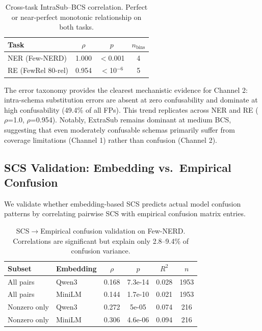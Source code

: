 \documentclass[11pt,a4paper]{article}
\begin{document}
\begin{table}[h]
\centering
\small
\begin{tabular}{@{}lccc@{}}
\toprule
\textbf{Task} & $\rho$ & $p$ & $n_{\text{bins}}$ \\
\midrule
NER (Few-NERD) & 1.000 & $<$0.001 & 4 \\
RE (FewRel 80-rel) & 0.954 & $<$10$^{-6}$ & 5 \\
\bottomrule
\end{tabular}
\caption{Cross-task IntraSub--BCS correlation. Perfect or near-perfect monotonic relationship on both tasks.}
\label{tab:cross_task_intrasub}
\end{table}

The error taxonomy provides the clearest mechanistic evidence for Channel 2: intra-schema substitution errors are absent at zero confusability and dominate at high confusability (49.4\% of all FPs). This trend replicates across NER and RE ($\rho$=1.0, $\rho$=0.954). Notably, ExtraSub remains dominant at medium BCS, suggesting that even moderately confusable schemas primarily suffer from coverage limitations (Channel 1) rather than confusion (Channel 2).

\subsection{SCS Validation: Embedding vs.\ Empirical Confusion}
\label{sec:scs}

We validate whether embedding-based SCS predicts actual model confusion patterns by correlating pairwise SCS with empirical confusion matrix entries.

\begin{table}[h]
\centering
\small
\begin{tabular}{@{}llcccc@{}}
\toprule
\textbf{Subset} & \textbf{Embedding} & $\rho$ & $p$ & $R^2$ & $n$ \\
\midrule
All pairs & Qwen3 & 0.168 & 7.3e-14 & 0.028 & 1953 \\
All pairs & MiniLM & 0.144 & 1.7e-10 & 0.021 & 1953 \\
Nonzero only & Qwen3 & 0.272 & 5e-05 & 0.074 & 216 \\
Nonzero only & MiniLM & 0.306 & 4.6e-06 & 0.094 & 216 \\
\bottomrule
\end{tabular}
\caption{SCS$\rightarrow$Empirical confusion validation on Few-NERD. Correlations are significant but explain only 2.8--9.4\% of confusion variance.}
\label{tab:scs_validation}
\end{table}
\end{document}
